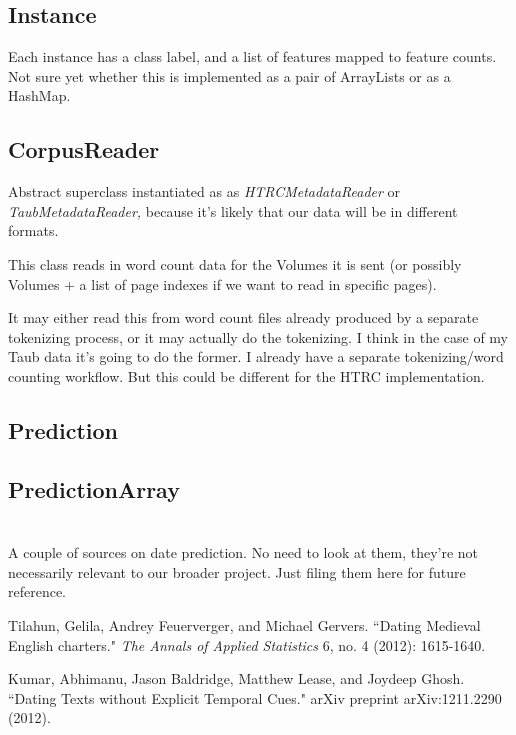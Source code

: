 \documentclass[12pt]{article}
\begin{document}
\subsection{Instance}
Each instance has a class label, and a list of features mapped to feature counts. Not sure yet whether this is implemented as a pair of ArrayLists or as a HashMap.

\subsection{CorpusReader}
Abstract superclass instantiated as as \emph{HTRCMetadataReader} or \emph{TaubMetadataReader,} because it's likely that our data will be in different formats.

This class reads in word count data for the Volumes it is sent (or possibly Volumes + a list of page indexes if we want to read in specific pages).

It may either read this from word count files already produced by a separate tokenizing process, or it may actually do the tokenizing. I think in the case of my Taub data it's going to do the former. I already have a separate tokenizing/word counting workflow. But this could be different for the HTRC implementation.

\subsection{Prediction}

\subsection{PredictionArray}

\section{}
A couple of sources on date prediction. No need to look at them, they're not necessarily relevant to our broader project. Just filing them here for future reference.
\begin{thebibliography}{1}
 Tilahun, Gelila, Andrey Feuerverger, and Michael Gervers. ``Dating Medieval English charters." \emph{The Annals of Applied Statistics} 6, no. 4 (2012): 1615-1640.

 Kumar, Abhimanu, Jason Baldridge, Matthew Lease, and Joydeep Ghosh. ``Dating Texts without Explicit Temporal Cues." arXiv preprint arXiv:1211.2290 (2012).
\end{thebibliography}
\end{document}

